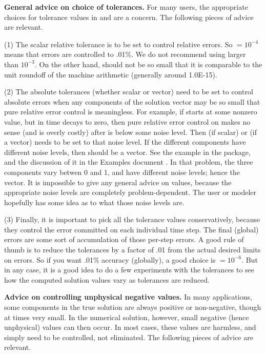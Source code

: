 {\bf General advice on choice of tolerances.}
For many users, the appropriate choices for tolerance values in
 and  are a concern.  The following pieces of
advice are relevant.

(1) The scalar relative tolerance  is to be set to control relative
errors.  So  $= 10^{-4}$ means that errors are controlled to .01\%.
We do not recommend using  larger than $10^{-3}$.  On the other hand,
 should not be so small that it is comparable to the unit roundoff
of the machine arithmetic (generally around 1.0E-15).

(2) The absolute tolerances  (whether scalar or vector) need to
be set to control absolute errors when any components of the solution
vector  may be so small that pure relative error control is
meaningless.  For example, if  starts at some nonzero value, but in time
decays to zero, then pure relative error control on  makes no sense
(and is overly costly) after  is below some noise level.  Then
 (if scalar) or  (if a vector) needs to be set to that
noise level.  If the different components have different noise levels,
then  should be a vector.  See the example  in the
{\cvode} package, and the discussion of it in the {\cvode} Examples document
\cite{cvode_ex}.
In that problem, the three components vary betwen 0 and 1, and have
different noise levels; hence the  vector.  It is impossible to
give any general advice on  values, because the appropriate noise
levels are completely problem-dependent.  The user or modeler hopefully has
some idea as to what those noise levels are.

(3) Finally, it is important to pick all the tolerance values conservatively,
because they control the error committed on each individual time step.
The final (global) errors are some sort of accumulation of those
per-step errors.  A good rule of thumb is to reduce the tolerances by a
factor of .01 from the actual desired limits on errors.  So if you
want .01\% accuracy (globally), a good choice is  $= 10^{-6}$.
But in any case, it is a good idea to do a few experiments with
the tolerances to see how the computed solution values vary as
tolerances are reduced.

\vspace{0.1in}
{\bf Advice on controlling unphysical negative values.}
In many applications, some components in the true solution are always
positive or non-negative, though at times very small.  In the numerical
solution, however, small negative (hence unphysical) values can then
occur.  In most cases, these values are harmless, and simply need to
be controlled, not eliminated. The following pieces of advice are relevant.

